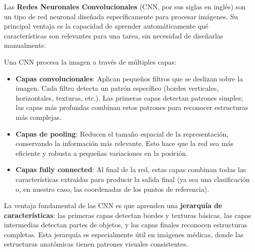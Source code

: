 Las \textbf{Redes Neuronales Convolucionales} (CNN, por sus siglas en inglés) son un tipo de red neuronal diseñada específicamente para procesar imágenes. Su principal ventaja es la capacidad de aprender automáticamente qué características son relevantes para una tarea, sin necesidad de diseñarlas manualmente.

Una CNN procesa la imagen a través de múltiples capas:

\begin{itemize}
    \item \textbf{Capas convolucionales}: Aplican pequeños filtros que se deslizan sobre la imagen. Cada filtro detecta un patrón específico (bordes verticales, horizontales, texturas, etc.). Las primeras capas detectan patrones simples; las capas más profundas combinan estos patrones para reconocer estructuras más complejas.

    \item \textbf{Capas de pooling}: Reducen el tamaño espacial de la representación, conservando la información más relevante. Esto hace que la red sea más eficiente y robusta a pequeñas variaciones en la posición.

    \item \textbf{Capas fully connected}: Al final de la red, estas capas combinan todas las características extraídas para producir la salida final (ya sea una clasificación o, en nuestro caso, las coordenadas de los puntos de referencia).
\end{itemize}

La ventaja fundamental de las CNN es que aprenden una \textbf{jerarquía de características}: las primeras capas detectan bordes y texturas básicas, las capas intermedias detectan partes de objetos, y las capas finales reconocen estructuras completas. Esta jerarquía es especialmente útil en imágenes médicas, donde las estructuras anatómicas tienen patrones visuales consistentes.

